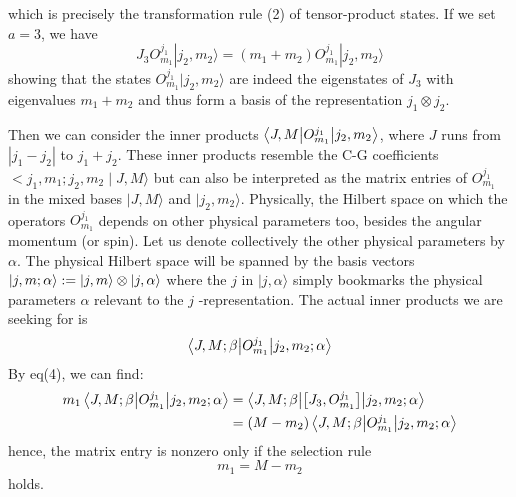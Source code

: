\documentclass{article}
\begin{document}
	which is precisely the transformation rule (2) of tensor-product states. If we set $a=3$, we have
	\begin{equation*}
		J_{3} O_{m_{1}}^{j_{1}}| j_{2} ,m_{2}\rangle  =( m_{1} +m_{2}) O_{m_{1}}^{j_{1}}| j_{2} ,m_{2}\rangle  
	\end{equation*}
	showing that the states $O_{m_{1}}^{j_{1}}| j_{2} ,m_{2}\rangle  $ are indeed the eigenstates of $J_{3}$ with eigenvalues $m_{1} +m_{2}$ and thus form a basis of the representation $j_{1} \otimes j_{2}$.
	
	Then we can consider the inner products $\mel**{J,M}{O_{m_{1}}^{j_{1}}}{j_{2} ,m_{2}}$, where $J$ runs from $| j_{1} -j_{2}| $ to $j_{1} +j_{2}$. These inner products resemble the C-G coefficients $< j_{1} ,m_{1} ;j_{2} ,m_{2} \mid J,M\rangle  $ but can also be interpreted as the matrix entries of $O_{m_{1}}^{j_{1}}$ in the mixed bases $|J,M\rangle  $ and $| j_{2} ,m_{2}\rangle  $. Physically, the Hilbert space on which the operators $O_{m_{1}}^{j_{1}}$ depends on other physical parameters too, besides the angular momentum (or spin). Let us denote collectively the other physical parameters by $\alpha $. The physical Hilbert space will be spanned by the basis vectors $|j,m;\alpha \rangle  :=\ket{j,m} \otimes \ket{j,\alpha }$ where the $j$ in $|j,\alpha \rangle  $ simply bookmarks the physical parameters $\alpha $ relevant to the $j$ -representation. The actual inner products we are seeking for is
	\begin{equation*}
		\mel**{J,M;\beta }{O_{m_{1}}^{j_{1}}}{j_{2} ,m_{2} ;\alpha }
	\end{equation*}
	By eq(4), we can find:
	\begin{equation*}
		\begin{aligned}
			m_{1}\mel**{J,M;\beta }{O_{m_{1}}^{j_{1}}}{j_{2} ,m_{2} ;\alpha } & =\mel**{J,M;\beta }{\left[ J_{3} ,O_{m_{1}}^{j_{1}}\right]}{j_{2} ,m_{2} ;\alpha }\\
			& =( M-m_{2})\mel**{J,M;\beta }{O_{m_{1}}^{j_{1}}}{j_{2} ,m_{2} ;\alpha }
		\end{aligned}
	\end{equation*}
	hence, the matrix entry is nonzero only if the selection rule
	\begin{equation*}
		m_{1} =M-m_{2}
	\end{equation*}
	holds. 
	
\end{document}
